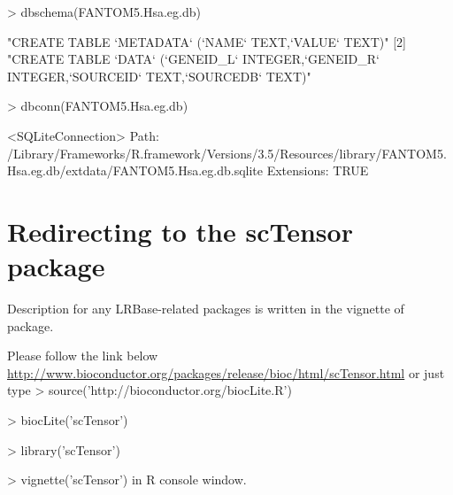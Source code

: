 \documentclass[11pt,a4paper,english,arial,twoside]{article}
\begin{document}
\begin{center}
\begin{Schunk}
\begin{Sinput}
> dbschema(FANTOM5.Hsa.eg.db)
\end{Sinput}
\begin{Soutput}
[1] "CREATE TABLE `METADATA` (\n  `NAME` TEXT,\n  `VALUE` TEXT\n)"                                                 
[2] "CREATE TABLE `DATA` (\n  `GENEID_L` INTEGER,\n  `GENEID_R` INTEGER,\n  `SOURCEID` TEXT,\n  `SOURCEDB` TEXT\n)"
\end{Soutput}
\begin{Sinput}
> dbconn(FANTOM5.Hsa.eg.db)
\end{Sinput}
\begin{Soutput}
<SQLiteConnection>
  Path: /Library/Frameworks/R.framework/Versions/3.5/Resources/library/FANTOM5.Hsa.eg.db/extdata/FANTOM5.Hsa.eg.db.sqlite
  Extensions: TRUE
\end{Soutput}
\end{Schunk}
\end{center}

\section{Redirecting to the scTensor package}

Description for any LRBase-related packages is written in the vignette of
 package.

\noindent
Please follow the link below
\newline\newline
\url{http://www.bioconductor.org/packages/release/bioc/html/scTensor.html}
\newline\newline
\noindent
or just type
\newline\newline
\noindent
> source('http://bioconductor.org/biocLite.R')

\noindent
> biocLite('scTensor')

\noindent
> library('scTensor')

\noindent
> vignette('scTensor')
\newline\newline
\noindent
in R console window.
\end{document}
